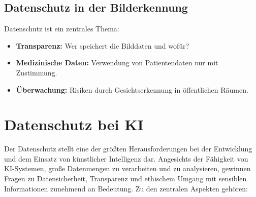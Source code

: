 \documentclass[a4paper,12pt]{article}
\begin{document}
\subsection{Datenschutz in der Bilderkennung}
Datenschutz ist ein zentrales Thema:
\begin{itemize}
    \item \textbf{Transparenz:} Wer speichert die Bilddaten und wofür?
    \item \textbf{Medizinische Daten:} Verwendung von Patientendaten nur mit Zustimmung.
    \item \textbf{Überwachung:} Risiken durch Gesichtserkennung in öffentlichen Räumen.
\end{itemize}

\section{Datenschutz bei KI}

Der Datenschutz stellt eine der größten Herausforderungen bei der Entwicklung und dem Einsatz von künstlicher Intelligenz dar. Angesichts der Fähigkeit von KI-Systemen, große Datenmengen zu verarbeiten und zu analysieren, gewinnen Fragen zu Datensicherheit, Transparenz und ethischem Umgang mit sensiblen Informationen zunehmend an Bedeutung. Zu den zentralen Aspekten gehören:
\end{document}
